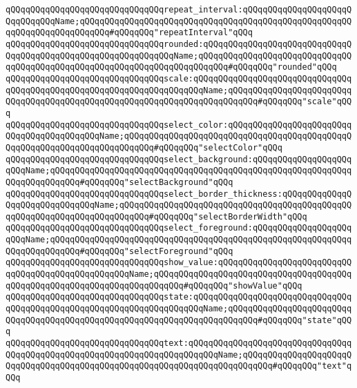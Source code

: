 \newline
\verb|qQQqqQQqqQQqqQQqqQQqqQQqqQQqqQQqrepeat_interval:qQQqqQQqqQQqqQQqqQQqqQQqqQQqqQQqName;qQQqqQQqqQQqqQQqqQQqqQQqqQQqqQQqqQQqqQQqqQQqqQQqqQQqqQQqqQQqqQQqqQQqqQQqqQQq#qQQqqQQq"repeatInterval"qQQq|\newline
\verb|qQQqqQQqqQQqqQQqqQQqqQQqqQQqqQQqrounded:qQQqqQQqqQQqqQQqqQQqqQQqqQQqqQQqqQQqqQQqqQQqqQQqqQQqqQQqqQQqqQQqName;qQQqqQQqqQQqqQQqqQQqqQQqqQQqqQQqqQQqqQQqqQQqqQQqqQQqqQQqqQQqqQQqqQQqqQQqqQQq#qQQqqQQq"rounded"qQQq|\newline
\newline
\verb|qQQqqQQqqQQqqQQqqQQqqQQqqQQqqQQqscale:qQQqqQQqqQQqqQQqqQQqqQQqqQQqqQQqqQQqqQQqqQQqqQQqqQQqqQQqqQQqqQQqqQQqqQQqName;qQQqqQQqqQQqqQQqqQQqqQQqqQQqqQQqqQQqqQQqqQQqqQQqqQQqqQQqqQQqqQQqqQQqqQQqqQQq#qQQqqQQq"scale"qQQq|\newline
\verb|qQQqqQQqqQQqqQQqqQQqqQQqqQQqqQQqselect_color:qQQqqQQqqQQqqQQqqQQqqQQqqQQqqQQqqQQqqQQqqQQqName;qQQqqQQqqQQqqQQqqQQqqQQqqQQqqQQqqQQqqQQqqQQqqQQqqQQqqQQqqQQqqQQqqQQqqQQqqQQq#qQQqqQQq"selectColor"qQQq|\newline
\verb|qQQqqQQqqQQqqQQqqQQqqQQqqQQqqQQqselect_background:qQQqqQQqqQQqqQQqqQQqqQQqName;qQQqqQQqqQQqqQQqqQQqqQQqqQQqqQQqqQQqqQQqqQQqqQQqqQQqqQQqqQQqqQQqqQQqqQQqqQQq#qQQqqQQq"selectBackground"qQQq|\newline
\newline
\verb|qQQqqQQqqQQqqQQqqQQqqQQqqQQqqQQqselect_border_thickness:qQQqqQQqqQQqqQQqqQQqqQQqqQQqqQQqName;qQQqqQQqqQQqqQQqqQQqqQQqqQQqqQQqqQQqqQQqqQQqqQQqqQQqqQQqqQQqqQQqqQQqqQQqqQQq#qQQqqQQq"selectBorderWidth"qQQq|\newline
\verb|qQQqqQQqqQQqqQQqqQQqqQQqqQQqqQQqselect_foreground:qQQqqQQqqQQqqQQqqQQqqQQqName;qQQqqQQqqQQqqQQqqQQqqQQqqQQqqQQqqQQqqQQqqQQqqQQqqQQqqQQqqQQqqQQqqQQqqQQqqQQq#qQQqqQQq"selectForeground"qQQq|\newline
\verb|qQQqqQQqqQQqqQQqqQQqqQQqqQQqqQQqshow_value:qQQqqQQqqQQqqQQqqQQqqQQqqQQqqQQqqQQqqQQqqQQqqQQqqQQqName;qQQqqQQqqQQqqQQqqQQqqQQqqQQqqQQqqQQqqQQqqQQqqQQqqQQqqQQqqQQqqQQqqQQqqQQqqQQq#qQQqqQQq"showValue"qQQq|\newline
\verb|qQQqqQQqqQQqqQQqqQQqqQQqqQQqqQQqstate:qQQqqQQqqQQqqQQqqQQqqQQqqQQqqQQqqQQqqQQqqQQqqQQqqQQqqQQqqQQqqQQqqQQqqQQqName;qQQqqQQqqQQqqQQqqQQqqQQqqQQqqQQqqQQqqQQqqQQqqQQqqQQqqQQqqQQqqQQqqQQqqQQqqQQq#qQQqqQQq"state"qQQq|\newline
\newline
\verb|qQQqqQQqqQQqqQQqqQQqqQQqqQQqqQQqtext:qQQqqQQqqQQqqQQqqQQqqQQqqQQqqQQqqQQqqQQqqQQqqQQqqQQqqQQqqQQqqQQqqQQqqQQqqQQqName;qQQqqQQqqQQqqQQqqQQqqQQqqQQqqQQqqQQqqQQqqQQqqQQqqQQqqQQqqQQqqQQqqQQqqQQqqQQq#qQQqqQQq"text"qQQq|\newline
